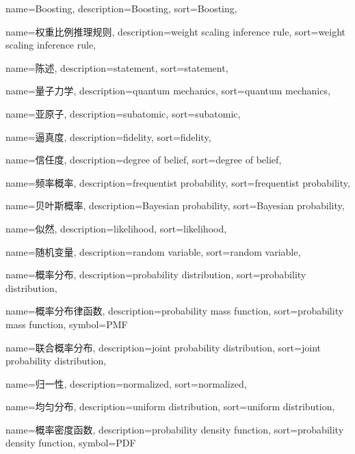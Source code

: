 {
  name=Boosting,
  description={Boosting},
  sort={Boosting},
}

{
  name=权重比例推理规则,
  description={weight scaling inference rule},
  sort={weight scaling inference rule},
}

{
  name=陈述,
  description={statement},
  sort={statement},
}

{
  name=量子力学,
  description={quantum mechanics},
  sort={quantum mechanics},
}

{
  name=亚原子,
  description={subatomic},
  sort={subatomic},
}

{
  name=逼真度,
  description={fidelity},
  sort={fidelity},
}

{
  name=信任度,
  description={degree of belief},
  sort={degree of belief},
}

{
  name=频率概率,
  description={frequentist probability},
  sort={frequentist probability},
}

{
  name=贝叶斯概率,
  description={Bayesian probability},
  sort={Bayesian probability},
}

{
  name=似然,
  description={likelihood},
  sort={likelihood},
}

{
  name=随机变量,
  description={random variable},
  sort={random variable},
}

{
  name=概率分布,
  description={probability distribution},
  sort={probability distribution},
}

{
  name=概率分布律函数,
  description={probability mass function},
  sort={probability mass function},
  symbol={PMF}
}

{
  name=联合概率分布,
  description={joint probability distribution},
  sort={joint probability distribution},
}

{
  name=归一性,
  description={normalized},
  sort={normalized},
}

{
  name=均匀分布,
  description={uniform distribution},
  sort={uniform distribution},
}

{
  name=概率密度函数,
  description={probability density function},
  sort={probability density function},
  symbol={PDF}
}


